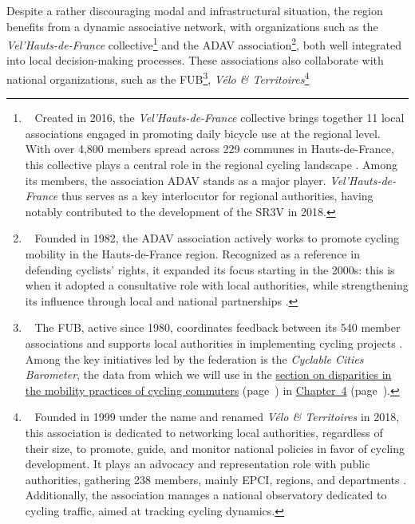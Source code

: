 \begin{refsegment}
Despite a rather discouraging modal and infrastructural situation, the region benefits from a dynamic associative network, with organizations such as the \textsl{Vel'Hauts-de-France} collective\footnote{~
    Created in 2016, the \textsl{Vel'Hauts-de-France} collective brings together 11 local associations engaged in promoting daily bicycle use at the regional level. With over 4,800 members spread across 229 communes in Hauts-de-France, this collective plays a central role in the regional cycling landscape \textcolor{blue}{\autocite{velhauts-de-france_collectif_2023}}. Among its members, the association \acrfull{ADAV} stands as a major player. \textsl{Vel'Hauts-de-France} thus serves as a key interlocutor for regional authorities, having notably contributed to the development of the \acrfull{SR3V} in 2018.
} and the \acrfull{ADAV} association\footnote{~
    Founded in 1982, the \acrfull{ADAV} association actively works to promote cycling mobility in the Hauts-de-France region. Recognized as a reference in defending cyclists' rights, it expanded its focus starting in the 2000s: this is when it adopted a consultative role with local authorities, while strengthening its influence through local and national partnerships \textcolor{blue}{\autocite{adav_qui_2016}}.
}, both well integrated into local decision-making processes. These associations also collaborate with national organizations, such as the \acrfull{FUB}\footnote{~
    The \acrfull{FUB}, active since 1980, coordinates feedback between its 540 member associations and supports local authorities in implementing cycling projects \textcolor{blue}{\autocite{fub_nos_nodate}}. Among the key initiatives led by the federation is the \textsl{Cyclable Cities Barometer}, the data from which we will use in the \hyperref[chap4:source-barometre-fub]{section on disparities in the mobility practices of cycling commuters} (page~\pageref{chap4:source-barometre-fub}) in \hyperref[chap4:titre]{Chapter~4} (page~\pageref{chap4:titre}).
}, \textsl{Vélo \& Territoires}\footnote{~
    Founded in 1999 under the name  and renamed \textsl{Vélo \& Territoires} in 2018, this association is dedicated to networking local authorities, regardless of their size, to promote, guide, and monitor national policies in favor of cycling development. It plays an advocacy and representation role with public authorities, gathering 238 members, mainly \acrshort{EPCI}, regions, and departments \textcolor{blue}{\autocite{velo__territoires_presentation_2024}}. Additionally, the association manages a national observatory dedicated to cycling traffic, aimed at tracking cycling dynamics.
}
\end{refsegment}
